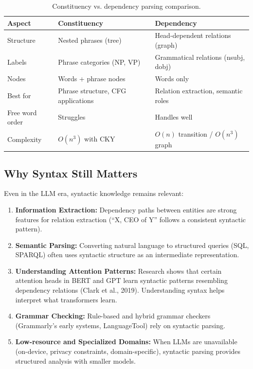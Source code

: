 \begin{table}[H]
\centering
\caption{Constituency vs. dependency parsing comparison.}
\label{tab:parsing_comparison}
\small
\begin{tabular}{@{}lll@{}}
\toprule
\textbf{Aspect} & \textbf{Constituency} & \textbf{Dependency} \\
\midrule
Structure & Nested phrases (tree) & Head-dependent relations (graph) \\
Labels & Phrase categories (NP, VP) & Grammatical relations (nsubj, dobj) \\
Nodes & Words + phrase nodes & Words only \\
Best for & Phrase structure, CFG applications & Relation extraction, semantic roles \\
Free word order & Struggles & Handles well \\
Complexity & $O(n^3)$ with CKY & $O(n)$ transition / $O(n^3)$ graph \\
\bottomrule
\end{tabular}
\end{table}

\subsection{Why Syntax Still Matters}
\label{sec:why_syntax}

Even in the LLM era, syntactic knowledge remains relevant:

\begin{enumerate}
    \item \textbf{Information Extraction:} Dependency paths between entities are strong
    features for relation extraction (``X, CEO of Y'' follows a consistent syntactic
    pattern).
    \item \textbf{Semantic Parsing:} Converting natural language to structured queries
    (SQL, SPARQL) often uses syntactic structure as an intermediate representation.
    \item \textbf{Understanding Attention Patterns:} Research shows that certain attention
    heads in BERT and GPT learn syntactic patterns resembling dependency relations
    (Clark et al., 2019). Understanding syntax helps interpret what transformers learn.
    \item \textbf{Grammar Checking:} Rule-based and hybrid grammar checkers (Grammarly's
    early systems, LanguageTool) rely on syntactic parsing.
    \item \textbf{Low-resource and Specialized Domains:} When LLMs are unavailable
    (on-device, privacy constraints, domain-specific), syntactic parsing provides
    structured analysis with smaller models.
\end{enumerate}

